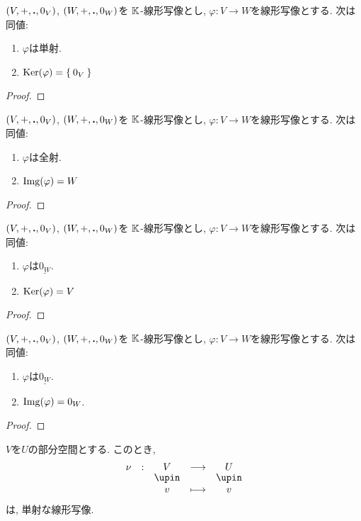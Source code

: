 \begin{prop}
  $(V,+,\mathbin{\boldsymbol{.}},0_V)$,
  $(W,+,\mathbin{\boldsymbol{.}},0_W)$を
  $\mathbb{K}$-線形写像とし,
  $\varphi\colon V\to W$を線形写像とする.
  次は同値:
  \begin{enumerate}
  \item $\varphi$は単射.
  \item $\operatorname{Ker}(\varphi)=\Set{0_V}$
  \end{enumerate}
\end{prop}
\begin{proof}\end{proof}

\begin{prop}
  $(V,+,\mathbin{\boldsymbol{.}},0_V)$,
  $(W,+,\mathbin{\boldsymbol{.}},0_W)$を
  $\mathbb{K}$-線形写像とし,
  $\varphi\colon V\to W$を線形写像とする.
  次は同値:
  \begin{enumerate}
  \item $\varphi$は全射.
  \item $\operatorname{Img}(\varphi)=W$
  \end{enumerate}
\end{prop}
\begin{proof}\end{proof}

\begin{prop}
  $(V,+,\mathbin{\boldsymbol{.}},0_V)$,
  $(W,+,\mathbin{\boldsymbol{.}},0_W)$を
  $\mathbb{K}$-線形写像とし,
  $\varphi\colon V\to W$を線形写像とする.
  次は同値:
  \begin{enumerate}
  \item $\varphi$は$\underline{0_W}$.
  \item $\operatorname{Ker}(\varphi)=V$
  \end{enumerate}
\end{prop}
\begin{proof}\end{proof}

\begin{prop}
  $(V,+,\mathbin{\boldsymbol{.}},0_V)$,
  $(W,+,\mathbin{\boldsymbol{.}},0_W)$を
  $\mathbb{K}$-線形写像とし,
  $\varphi\colon V\to W$を線形写像とする.
  次は同値:
  \begin{enumerate}
  \item $\varphi$は$\underline{0_W}$.
  \item $\operatorname{Img}(\varphi)=0_W$.
  \end{enumerate}
\end{prop}
\begin{proof}\end{proof}

\begin{prop}
  $V$を$U$の部分空間とする.
  このとき,
  \begin{align*}
    \shazo{\nu}{V}{U}
    {v}{v}
  \end{align*}
  は, 単射な線形写像.
\end{prop}


